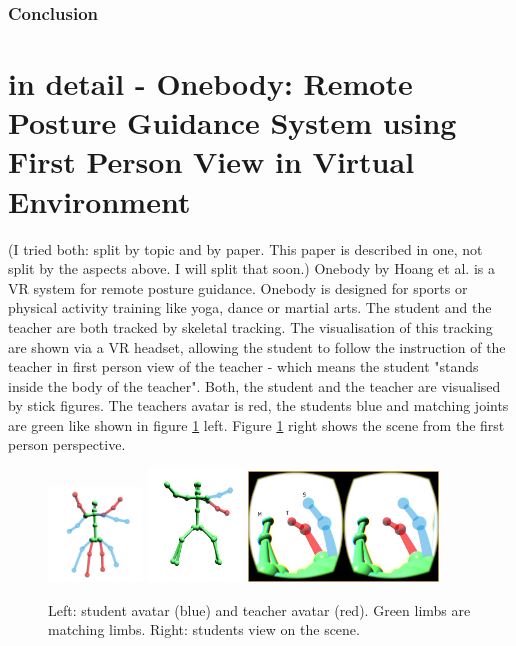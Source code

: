 \subsubsection{Conclusion}






\section{in detail - Onebody: Remote Posture Guidance System using First Person View in Virtual Environment}
(I tried both: split by topic and by paper. This paper is described in one, not split by the aspects above. I will split that soon.)
Onebody by Hoang et al. \cite{Reinoso2016} is a VR system for remote posture guidance. Onebody is designed for sports or physical activity training like yoga, dance or martial arts. The student and the teacher are both tracked by skeletal tracking. The visualisation of this tracking are shown via a VR headset, allowing the student to follow the instruction of the teacher in first person view of the teacher - which means the student "stands inside the body of the teacher". Both, the student and the teacher are visualised by stick figures. The teachers avatar is red, the students blue and matching joints are green like shown in figure \ref{fig:ob1} left. Figure \ref{fig:ob1} right shows the scene from the first person perspective.
\begin{figure}
	\centering
	\includegraphics[width=0.225\textwidth]{img/onebody1.png}
	\includegraphics[width=0.225\textwidth]{img/onebody2.png}
	\includegraphics[width=0.45\textwidth]{img/onebody3.png}
	\caption{Left: student avatar (blue) and teacher avatar (red). Green limbs are matching limbs. Right: students view on the scene.\cite{Reinoso2016}}
	\label{fig:ob1}
\end{figure}
